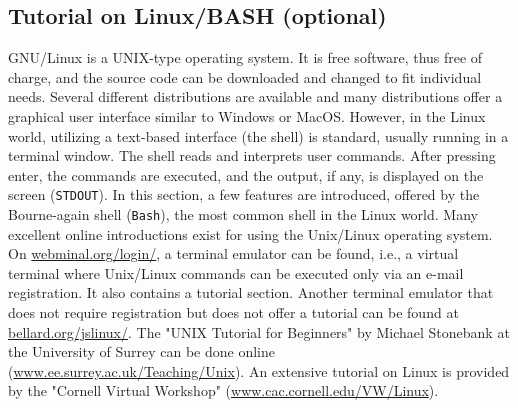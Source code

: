 \documentclass[9pt,tutorial]{livecoms}
\begin{document}
\subsection*{Tutorial on Linux/BASH (optional)}
GNU/Linux is a UNIX-type operating system. It is free software, thus free of charge, and the source code can be downloaded and changed to fit individual needs. Several different distributions are available and many distributions offer a graphical user interface similar to Windows or MacOS. However, in the Linux world, utilizing a text-based interface (the shell) is standard, usually running in a terminal window. The shell reads and interprets user commands. After pressing enter, the commands are executed, and the output, if any, is displayed on the screen (\texttt{STDOUT}). In this section, a few features are introduced, offered by the Bourne-again shell (\texttt{Bash}), the most common shell in the Linux world. Many excellent online introductions exist for using the Unix/Linux operating system.\\
On \url{webminal.org/login/}, a terminal emulator can be found, i.e., a virtual terminal where Unix/Linux commands can be executed only via an e-mail registration. It also contains a tutorial section. Another terminal emulator that does not require registration but does not offer a tutorial can be found at \url{bellard.org/jslinux/}. The "UNIX Tutorial for Beginners" by Michael Stonebank at the University of Surrey can be done online (\url{www.ee.surrey.ac.uk/Teaching/Unix}). An extensive tutorial on Linux is provided by the "Cornell Virtual Workshop" (\url{www.cac.cornell.edu/VW/Linux}). 
\end{document}
